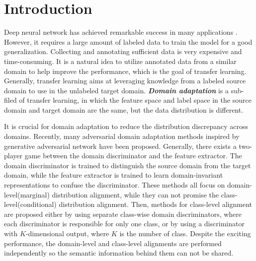 \documentclass{ecai}
\begin{document}
\section{Introduction}

Deep neural network has achieved remarkable success in many applications \cite{b1}. However, it requires a large amount of labeled data to train the model for a good generalization. Collecting and annotating sufficient data is very expensive and time-consuming. It is a natural idea to utilize annotated data from a similar domain to help improve the performance, which is the goal of transfer learning. Generally, transfer learning aims at leveraging knowledge from a labeled source domain to use in the unlabeled target domain\cite{b2}. \textbf{{\emph{Domain adaptation}}} is a sub-filed of transfer learning, in which the feature space and label space in the source domain and target domain are the same, but the data distribution is different\cite{b2}.


It is crucial for domain adaptation to reduce the distribution discrepancy across domains\cite{b4,b5}.
Recently, many adversarial domain adaptation methods inspired by generative adversarial network\cite{b12} have been proposed. Generally, there exists a two-player game between the domain discriminator and the feature extractor\cite{b18,b33,b24,b37}. The domain discriminator is trained to distinguish the source domain from the target domain, while the feature extractor is trained to learn domain-invariant representations to confuse the discriminator. These methods all focus on domain-level(marginal) distribution alignment, while they can not promise the class-level(conditional) distribution alignment. Then, methods for class-level alignment are proposed either by using separate class-wise domain discriminators, where each discriminator is responsible for only one class\cite{b13}, or by using a discriminator with $K$-dimensional output, where $K$ is the number of class\cite{b14}.  Despite the exciting performance, the domain-level and class-level alignments are performed independently so the semantic information behind them can not be shared.


\setlength{\abovecaptionskip}{-0.4cm}  \setlength{\belowcaptionskip}{-0.1cm}   
\end{document}
